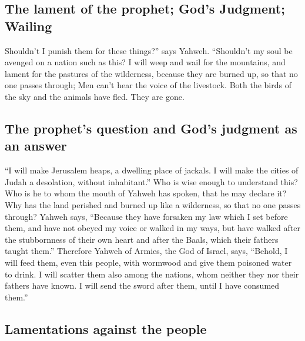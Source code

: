 \hypertarget{the-lament-of-the-prophet-gods-judgment-wailing}{%
\subsection{The lament of the prophet; God's Judgment;
Wailing}\label{the-lament-of-the-prophet-gods-judgment-wailing}}

 Shouldn't I punish them for these things?'' says Yahweh.
``Shouldn't my soul be avenged on a nation such as this? 
I will weep and wail for the mountains, and lament for the pastures of
the wilderness, because they are burned up, so that no one passes
through; Men can't hear the voice of the livestock. Both the birds of
the sky and the animals have fled. They are gone.

\hypertarget{the-prophets-question-and-gods-judgment-as-an-answer}{%
\subsection{The prophet's question and God's judgment as an
answer}\label{the-prophets-question-and-gods-judgment-as-an-answer}}

 ``I will make Jerusalem heaps, a dwelling place of
jackals. I will make the cities of Judah a desolation, without
inhabitant.''  Who is wise enough to understand this? Who
is he to whom the mouth of Yahweh has spoken, that he may declare it?
Why has the land perished and burned up like a wilderness, so that no
one passes through?  Yahweh says, ``Because they have
forsaken my law which I set before them, and have not obeyed my voice or
walked in my ways,  but have walked after the
stubbornness of their own heart and after the Baals, which their fathers
taught them.''  Therefore Yahweh of Armies, the God of
Israel, says, ``Behold, I will feed them, even this people, with
wormwood and give them poisoned water to drink.  I will
scatter them also among the nations, whom neither they nor their fathers
have known. I will send the sword after them, until I have consumed
them.''

\hypertarget{lamentations-against-the-people}{%
\subsection{Lamentations against the
people}\label{lamentations-against-the-people}}

